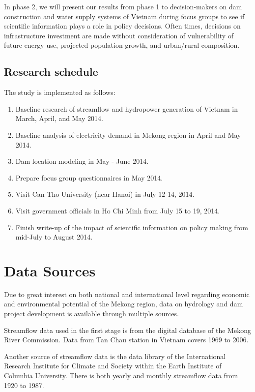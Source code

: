 \documentclass[11pt,english]{article}
\theoremstyle{plain} \newtheorem{claim}{Claim}
\theoremstyle{plain} \newtheorem{prop}{Proposition}
\theoremstyle{plain} \newtheorem{hypo}{Hypothesis}
\begin{document}
In phase 2, we will present our results from phase 1 to decision-makers on dam construction and water supply systems of Vietnam during focus groups to see if scientific information plays a role in policy decisions. Often times, decisions on infrastructure investment are made without consideration of vulnerability of future energy use, projected population growth, and urban/rural composition.  

\subsection{Research schedule}
The study is implemented as follows:
\begin{enumerate}
	\item Baseline research of streamflow and hydropower generation of Vietnam in March, April, and May 2014.
	\item Baseline analysis of electricity demand in Mekong region in April and May 2014.
	\item Dam location modeling in May - June 2014.
	\item Prepare focus group questionnaires in May 2014.
	\item Visit Can Tho University (near Hanoi) in July 12-14, 2014.
	\item Visit government officials in Ho Chi Minh from July 15 to 19, 2014.
	\item Finish write-up of the impact of scientific information on policy making from mid-July to August 2014. 

\end{enumerate}

\section{Data Sources}

Due to great interest on both national and international level regarding economic and environmental potential of the Mekong region, data on hydrology and dam project development is available through multiple sources. 

Streamflow data used in the first stage is from the digital database of the Mekong River Commission. Data from Tan Chau station in Vietnam covers 1969 to 2006. 

Another source of streamflow data is the data library of the International Research Institute for Climate and Society within the Earth Institute of Columbia University. There is both yearly and monthly streamflow data from 1920 to 1987. 
\end{document}
